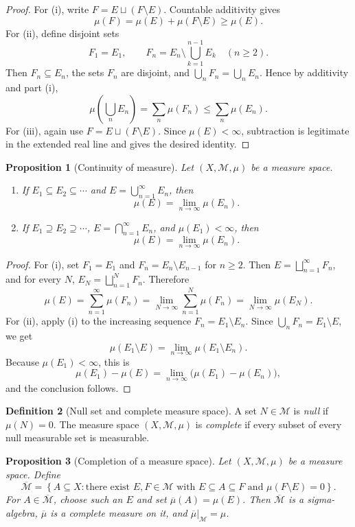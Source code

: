 \documentclass[11pt,openany]{book}
\numberwithin{equation}{chapter}
\theoremstyle{definition}
\newtheorem{definition}{Definition}[chapter]
\theoremstyle{plain}
\newtheorem{proposition}[definition]{Proposition}
\theoremstyle{remark}
\newcommand{\M}{\mathcal{M}}
\newcommand{\1}{\mathbf{1}}
\newcommand{\set}[1]{\left\{#1\right\}}
\begin{document}
\begin{proof}
For (i), write \(F=E\sqcup(F\setminus E)\). Countable additivity gives
\[
  \mu(F)=\mu(E)+\mu(F\setminus E)\geq \mu(E).
\]
For (ii), define disjoint sets
\[
  F_1=E_1,\qquad F_n=E_n\setminus\bigcup_{k=1}^{n-1}E_k\quad(n\geq2).
\]
Then \(F_n\subseteq E_n\), the sets \(F_n\) are disjoint, and \(\bigcup_nF_n=\bigcup_nE_n\). Hence by additivity and part (i),
\[
  \mu\left(\bigcup_nE_n\right)=\sum_n\mu(F_n)\leq\sum_n\mu(E_n).
\]
For (iii), again use \(F=E\sqcup(F\setminus E)\). Since \(\mu(E)<\infty\), subtraction is legitimate in the extended real line and gives the desired identity.
\end{proof}

\begin{proposition}[Continuity of measure]
Let \((X,\M,\mu)\) be a measure space.
\begin{enumerate}[label=\textup{(\roman*)}]
  \item If \(E_1\subseteq E_2\subseteq\cdots\) and \(E=\bigcup_{n=1}^{\infty}E_n\), then
  \[
    \mu(E)=\lim_{n\to\infty}\mu(E_n).
  \]
  \item If \(E_1\supseteq E_2\supseteq\cdots\), \(E=\bigcap_{n=1}^{\infty}E_n\), and \(\mu(E_1)<\infty\), then
  \[
    \mu(E)=\lim_{n\to\infty}\mu(E_n).
  \]
\end{enumerate}
\end{proposition}

\begin{proof}
For (i), set \(F_1=E_1\) and \(F_n=E_n\setminus E_{n-1}\) for \(n\geq2\). Then \(E=\bigsqcup_{n=1}^{\infty}F_n\), and for every \(N\), \(E_N=\bigsqcup_{n=1}^NF_n\). Therefore
\[
  \mu(E)=\sum_{n=1}^{\infty}\mu(F_n)=\lim_{N\to\infty}\sum_{n=1}^N\mu(F_n)=\lim_{N\to\infty}\mu(E_N).
\]
For (ii), apply (i) to the increasing sequence \(F_n=E_1\setminus E_n\). Since \(\bigcup_nF_n=E_1\setminus E\), we get
\[
  \mu(E_1\setminus E)=\lim_{n\to\infty}\mu(E_1\setminus E_n).
\]
Because \(\mu(E_1)<\infty\), this is
\[
  \mu(E_1)-\mu(E)=\lim_{n\to\infty}\bigl(\mu(E_1)-\mu(E_n)\bigr),
\]
and the conclusion follows.
\end{proof}

\begin{definition}[Null set and complete measure space]
A set \(N\in\M\) is \emph{null} if \(\mu(N)=0\). The measure space \((X,\M,\mu)\) is \emph{complete} if every subset of every null measurable set is measurable.
\end{definition}

\begin{proposition}[Completion of a measure space]
Let \((X,\M,\mu)\) be a measure space. Define
\[
  \overline{\M}=\set{A\subseteq X: \text{there exist }E,F\in\M\text{ with }E\subseteq A\subseteq F\text{ and }\mu(F\setminus E)=0}.
\]
For \(A\in\overline{\M}\), choose such an \(E\) and set \(\overline\mu(A)=\mu(E)\). Then \(\overline{\M}\) is a sigma-algebra, \(\overline\mu\) is a complete measure on it, and \(\overline\mu|_{\M}=\mu\).
\end{proposition}
\end{document}

